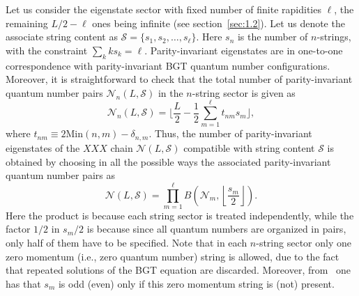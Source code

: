 \documentclass[11pt]{iopart}
\begin{document}
Let us consider the eigenstate sector with fixed number of finite rapidities 
$\ell$, the remaining $L/2-\ell$ ones being infinite (see section~\ref{sec:1.2}). 
Let us denote the associate string content as ${\mathcal S}=\{s_1,s_2,\dots,
s_{\ell}\}$. Here $s_n$ is the number of $n$-strings, with the constraint 
$\sum_k ks_k=\ell$. 
Parity-invariant eigenstates are in one-to-one correspondence with parity-invariant 
BGT quantum number configurations. Moreover, it is straightforward to check that 
the total number of parity-invariant quantum number pairs ${\mathcal N}_n(L,{
\mathcal S})$ in the $n$-string sector is given as 
%
\begin{equation}
\label{NnLS}
{\mathcal N}_n(L,{\mathcal S})=\Big\lfloor\frac{L}{2}-\frac{1}{2}
\sum_{m=1}^{\ell}t_{nm}s_m\Big\rfloor,
\end{equation}
%
where $t_{nm}\equiv 2\textrm{Min}(n,m)-\delta_{n,m}$. Thus, the number of parity-invariant 
eigenstates of the $XXX$ chain ${\mathcal N}(L,{\mathcal S})$ compatible with string content 
${\mathcal S}$ is obtained by choosing in all the possible ways the associated parity-invariant 
quantum number pairs as     
%
\begin{equation}
\label{NLS}
{\mathcal N}(L,{\mathcal S})=\prod_{m=1}^{\ell} B\left({\mathcal N}_m,\left\lfloor
\frac{s_m}{2}\right\rfloor\right).
\end{equation}
%
Here the product is because each string sector is treated independently, while the 
factor $1/2$ in $s_m/2$ is because since all quantum numbers are organized in pairs, 
only half of them have to be specified. Note that in each $n$-string sector only one 
zero momentum (i.e., zero quantum number) string is allowed, due to the fact that 
repeated solutions of the BGT equation are discarded. Moreover, from~ one has 
that $s_m$ is odd (even) only if this zero momentum string is (not) present. 
\end{document}
